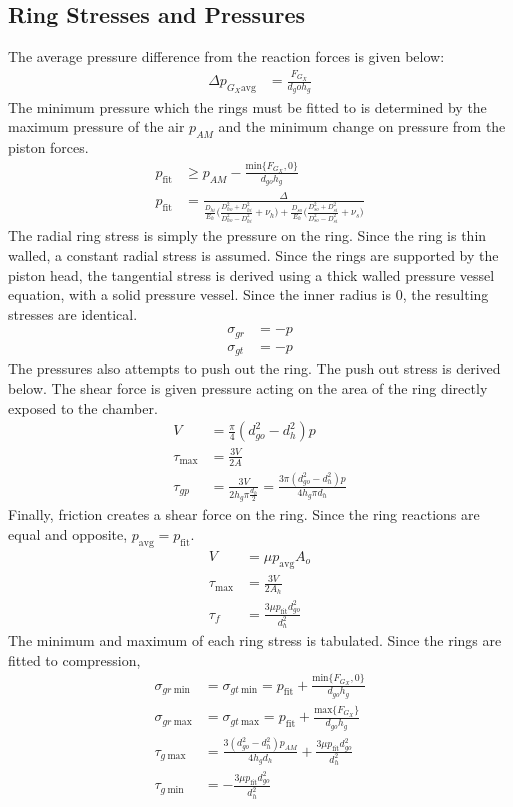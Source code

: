 \documentclass[10pt,a4paper]{article}
\begin{document}
	\subsection*{Ring Stresses and Pressures}
	The average pressure difference from the reaction forces is given below:
	\begin{align}
	 \Delta p_{G_X \text{avg}} &= \frac{F_{G_X}}{d_go h_g}
	\end{align}
	The minimum pressure which the rings must be fitted to is determined by the maximum pressure of the air $p_{AM}$ and the minimum change on pressure from the piston forces.
	\begin{align}
	p_{\text{fit}} &\geq p_{AM} - \frac{\text{min} \{ F_{G_X}, 0 \}}{d_{go} h_g}\\
	p_{\text{fit}} &= \frac{\Delta}{\frac{D_{hi}}{E_h} \Big( \frac{D_{ho}^2+D_{hi}^2}{D_{ho}^2-D_{hi}^2} + \nu_h \big) +\frac{D_{so}}{E_h} \Big( \frac{D_{so}^2+D_{si}^2}{D_{so}^2-D_{si}^2} + \nu_s \big) }
	\end{align}
	The radial ring stress is simply the pressure on the ring. Since the ring is thin walled, a constant radial stress is assumed.
	Since the rings are supported by the piston head, the tangential stress is derived using a thick walled pressure vessel equation, with a solid pressure vessel. Since the inner radius is 0, the resulting stresses are identical.
	\begin{align}
		\sigma_{gr} &= -p\\
		\sigma_{gt} &= -p
	\end{align}
	The pressures also attempts to push out the ring. The push out stress is derived below. The shear force is given pressure acting on the area of the ring directly exposed to the chamber.
	\begin{align}
	 V &= \frac{\pi}{4}(d_{go}^2-d_{h}^2) p\\
	 \tau_{\text{max}} &= \frac{3V}{2A} \\
	 \tau_{gp} &= \frac{3V}{2 h_g \pi \frac{d_h}{2} } = \frac{3 \pi (d_{go}^2-d_{h}^2) p}{4 h_g \pi d_h} 
	\end{align}
	Finally, friction creates a shear force on the ring. Since the ring reactions are equal and opposite, $p_{\text{avg}} = p_{\text{fit}}$.
	\begin{align}
		V &=  \mu p_{\text{avg}} A_o \\
		\tau_{\text{max}} &= \frac{3V}{2A_h} \\
		\tau_{f} &= \frac{3 \mu p_{\text{fit}} d_{go}^2}{d_h^2} 
	\end{align}
	The minimum and maximum of each ring stress is tabulated. Since the rings are fitted to compression, 
	\begin{align}
		\sigma_{gr\ \text{min}} &= \sigma_{gt\ \text{min}} = p_{\text{fit}} + \frac{\text{min} \{ F_{G_X}, 0 \}}{d_{go} h_g}\\
		\sigma_{gr\ \text{max}} &= \sigma_{gt\ \text{max}} = p_{\text{fit}} + \frac{\text{max} \{ F_{G_X}\}}{d_{go} h_g}\\
		\tau_{g\ \text{max}} &= \frac{3  (d_{go}^2-d_{h}^2) p_{AM}}{4 h_g d_h} + \frac{3 \mu p_{\text{fit}} d_{go}^2}{d_h^2}\\
		\tau_{g\  \text{min}} &= -\frac{3 \mu p_{\text{fit}} d_{go}^2}{d_h^2}
	\end{align}
\end{document}
